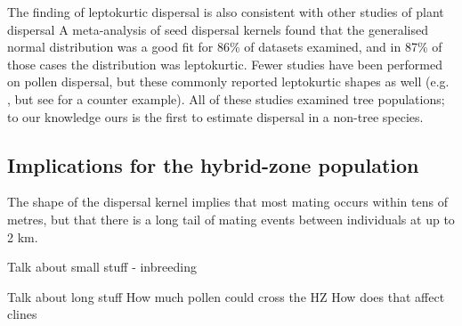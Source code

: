 \documentclass[10pt, a4paper, twocolumn]{article} %
\begin{document}
The finding of leptokurtic dispersal is also consistent with other studies of plant dispersal
A meta-analysis of seed dispersal kernels found that the generalised normal distribution was a good fit for 86\% of datasets examined, and in 87\% of those cases the distribution was leptokurtic.
Fewer studies have been performed on pollen dispersal, but these commonly reported leptokurtic shapes as well (e.g. \cite{adams1992using, austerlitz2004using, robledo2005patterns, klein2008pollen, burczyk2019patterns}, but see \cite{ottewell2012pollen} for a counter example).
All of these studies examined tree populations; to our knowledge ours is the first to estimate dispersal in a non-tree species.

\subsection{Implications for the hybrid-zone population}
The shape of the dispersal kernel implies that most mating occurs within tens of metres, but that there is a long tail of mating events between individuals at up to 2 km.

Talk about small stuff - inbreeding

Talk about long stuff
How much pollen could cross the HZ
How does that affect clines



\printbibliography[title={Bibliography}] %

\end{document}
